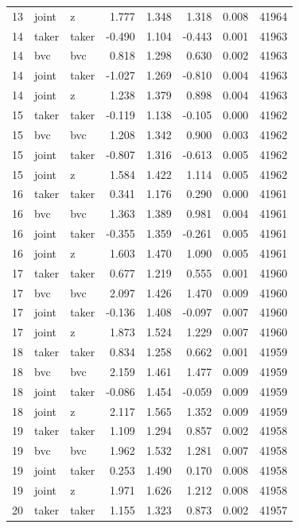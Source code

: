 \begin{tabular}{rllrrrrr}
13 & joint & z & 1.777 & 1.348 & 1.318 & 0.008 & 41964 \\
14 & taker & taker & -0.490 & 1.104 & -0.443 & 0.001 & 41963 \\
14 & bvc & bvc & 0.818 & 1.298 & 0.630 & 0.002 & 41963 \\
14 & joint & taker & -1.027 & 1.269 & -0.810 & 0.004 & 41963 \\
14 & joint & z & 1.238 & 1.379 & 0.898 & 0.004 & 41963 \\
15 & taker & taker & -0.119 & 1.138 & -0.105 & 0.000 & 41962 \\
15 & bvc & bvc & 1.208 & 1.342 & 0.900 & 0.003 & 41962 \\
15 & joint & taker & -0.807 & 1.316 & -0.613 & 0.005 & 41962 \\
15 & joint & z & 1.584 & 1.422 & 1.114 & 0.005 & 41962 \\
16 & taker & taker & 0.341 & 1.176 & 0.290 & 0.000 & 41961 \\
16 & bvc & bvc & 1.363 & 1.389 & 0.981 & 0.004 & 41961 \\
16 & joint & taker & -0.355 & 1.359 & -0.261 & 0.005 & 41961 \\
16 & joint & z & 1.603 & 1.470 & 1.090 & 0.005 & 41961 \\
17 & taker & taker & 0.677 & 1.219 & 0.555 & 0.001 & 41960 \\
17 & bvc & bvc & 2.097 & 1.426 & 1.470 & 0.009 & 41960 \\
17 & joint & taker & -0.136 & 1.408 & -0.097 & 0.007 & 41960 \\
17 & joint & z & 1.873 & 1.524 & 1.229 & 0.007 & 41960 \\
18 & taker & taker & 0.834 & 1.258 & 0.662 & 0.001 & 41959 \\
18 & bvc & bvc & 2.159 & 1.461 & 1.477 & 0.009 & 41959 \\
18 & joint & taker & -0.086 & 1.454 & -0.059 & 0.009 & 41959 \\
18 & joint & z & 2.117 & 1.565 & 1.352 & 0.009 & 41959 \\
19 & taker & taker & 1.109 & 1.294 & 0.857 & 0.002 & 41958 \\
19 & bvc & bvc & 1.962 & 1.532 & 1.281 & 0.007 & 41958 \\
19 & joint & taker & 0.253 & 1.490 & 0.170 & 0.008 & 41958 \\
19 & joint & z & 1.971 & 1.626 & 1.212 & 0.008 & 41958 \\
20 & taker & taker & 1.155 & 1.323 & 0.873 & 0.002 & 41957 \\

\end{tabular}
